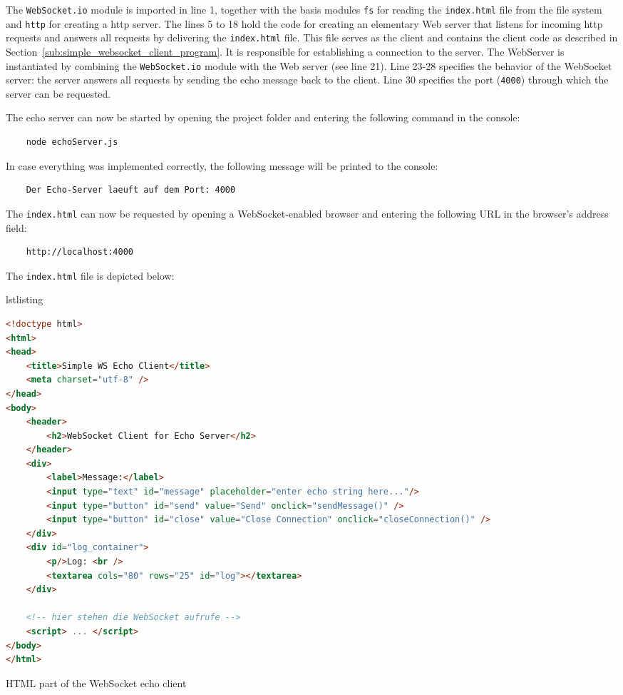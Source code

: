 \documentclass[a4paper, justified, notoc]{tufte-handout} %
\makeatletter
\newenvironment{listing}[1][htbp] %
  {\ifvmode\else\unskip\fi\begin{@tufte@float}[#1]{lstlisting}{}}
  {\end{@tufte@float} } %
\makeatother
\begin{document}
The \texttt{WebSocket.io} module is imported in line 1, together with the basis modules \texttt{fs} for reading the \texttt{index.html} file from the file system and \texttt{http} for creating a http server. 
The lines 5 to 18 hold the code for creating an elementary Web server that listens for incoming http requests and answers all requests by delivering the \texttt{index.html} file. This file serves as the client and contains the client code as described in Section~\ref{sub:simple_websocket_client_program}. It is responsible for establishing a connection to the server. The WebServer is instantiated by combining the \texttt{WebSocket.io} module with the Web server (see line 21). Line 23-28 specifies the behavior of the WebSocket server: the server answers all requests by sending the echo message back to the client. Line 30 specifies the port (\texttt{4000}) through which the server can be requested.

The echo server can now be started by opening the project folder and entering the following command in the console:
\begin{Verbatim}
	node echoServer.js
\end{Verbatim}
In case everything was implemented correctly, the following message will be printed to the console:
\begin{Verbatim}
	Der Echo-Server laeuft auf dem Port: 4000
\end{Verbatim}
The \texttt{index.html} can now be requested by opening a WebSocket-enabled browser and entering the following URL in the browser's address field:
\begin{Verbatim}
	http://localhost:4000
\end{Verbatim}
The \texttt{index.html} file is depicted below:
\begin{listing} %
\begin{lstlisting}[language=HTML]
<!doctype html>
<html>
<head>
    <title>Simple WS Echo Client</title>
    <meta charset="utf-8" />
</head>
<body>
    <header>
        <h2>WebSocket Client for Echo Server</h2>
    </header>
    <div>
        <label>Message:</label>
        <input type="text" id="message" placeholder="enter echo string here..."/>
        <input type="button" id="send" value="Send" onclick="sendMessage()" />
        <input type="button" id="close" value="Close Connection" onclick="closeConnection()" />
    </div>
    <div id="log_container">
        <p/>Log: <br />
        <textarea cols="80" rows="25" id="log"></textarea>
    </div>

    <!-- hier stehen die WebSocket aufrufe -->
    <script> ... </script>
</body>
</html>
\end{lstlisting}
	\caption{HTML part of the WebSocket echo client}
	\label{echo_client_1}
\end{listing}
\end{document}
